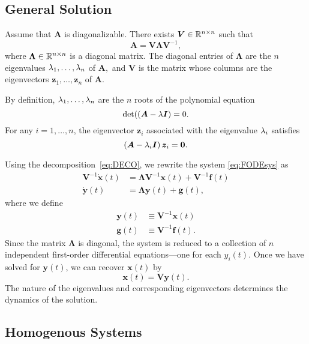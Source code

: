 \documentclass[letterpaper,12pt,leqno]{article}
\begin{document}
\subsection{General Solution}

Assume that $\bm{A}$ is diagonalizable. There exists $\bm{V}\in \mathbb{R}^{n\times n}$ such that
\begin{equation}
\bm{A}=\bm{V}\bm{\Lambda}\bm{V}^{-1},\label{eq:DECO}
\end{equation}
where $\bm{\Lambda}\in \mathbb{R}^{n\times n}$ is a diagonal matrix. The diagonal entries of $\bm{\Lambda}$ are the $n$ eigenvalues $\lambda_{1},\ldots,\lambda_{n}$ of $\bm{A},$ and $\bm{V}$ is the matrix whose
columns are the eigenvectors $\bm{z}_{1},\ldots,\bm{z}_{n}$ of $\bm{A}$. 

By definition, $\lambda_{1},\ldots,\lambda_{n}$ are the $n$ roots of the polynomial equation
\begin{equation*}
\det( \left( \bm{A}-\lambda \bm{I} \right) =0.
\end{equation*}
For any $i=1,\dots,n$, the eigenvector $\bm{z}_{i}$ associated with the eigenvalue $\lambda_{i}$ satisfies 
\begin{equation*}
\left( \bm{A}-\lambda_{i} \bm{I} \right) \bm{z}_{i} =\bm{0}.
\end{equation*}


Using the decomposition~\eqref{eq:DECO}, we rewrite the system \eqref{eq:FODEsys} as
\begin{align}
\bm{V}^{-1}\bm{\dot{x}}(t) &=\bm{\Lambda} \bm{V}^{-1}\bm{x}(t) +\bm{V}^{-1}\bm{f}(t)\nonumber\\
\bm{\dot{y}}(t) &=\bm{\Lambda} \bm{y}(t) +\bm{g}(t) ,  \label{eq:FODEsyst}
\end{align}
where we define
\begin{align*}
\bm{y}(t) &\equiv \bm{V}^{-1}\bm{x}(t)\\
\bm{g}(t) &\equiv \bm{V}^{-1}\bm{f}(t).
\end{align*}
Since the matrix $\bm{\Lambda}$ is diagonal, the system is reduced to a collection of $n$ independent first-order differential equations---one for each $y_{i}(t)$. Once we have solved for $\bm{y}(t)$, we can recover $\bm{x}(t)$ by 
\begin{equation*}
\bm{x}(t) =\bm{V} \bm{y}(t) .
\end{equation*}
The nature of the eigenvalues and corresponding eigenvectors determines the dynamics of the solution.

\subsection{Homogenous Systems}
\end{document}
